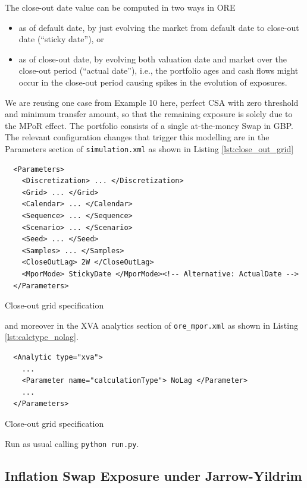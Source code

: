 \documentclass[12pt, a4paper]{article}
\begin{document}
{The close-out date value can be computed in two ways in ORE
\begin{itemize}
\item as of default date, by just evolving the market from default date to close-out date
   (``sticky date''), or 
\item  as of close-out date, by evolving both valuation date and market over the 
   close-out period (``actual date''), i.e., the portfolio ages and cash flows might occur
   in the close-out period causing spikes in the evolution of exposures. 
\end{itemize}

We are reusing one case from Example 10 here, perfect CSA with zero threshold and
minimum transfer amount, so that the remaining exposure is solely due to the MPoR
effect. The portfolio consists of a single at-the-money Swap in GBP. 
The relevant configuration changes that trigger this modelling are in the Parameters section of {\tt simulation.xml} as shown in Listing \ref{lst:close_out_grid}

\begin{listing}[H]
\begin{verbatim}
  <Parameters>
    <Discretization> ... </Discretization>
    <Grid> ... </Grid>
    <Calendar> ... </Calendar>
    <Sequence> ... </Sequence>
    <Scenario> ... </Scenario>
    <Seed> ... </Seed>
    <Samples> ... </Samples>
    <CloseOutLag> 2W </CloseOutLag>
    <MporMode> StickyDate </MporMode><!-- Alternative: ActualDate -->
  </Parameters>
\end{verbatim}
\caption{Close-out grid specification}
\label{lst:close_out_grid}
\end{listing}

and moreover in the XVA analytics section of {\tt ore\_mpor.xml} as shown in Listing \ref{lst:calctype_nolag}.

\begin{listing}[H]
\begin{verbatim}
  <Analytic type="xva">
    ...
    <Parameter name="calculationType"> NoLag </Parameter>
    ...
  </Parameters>
\end{verbatim}
\caption{Close-out grid specification}
\label{lst:calctype_nolag}
\end{listing}

Run as usual calling {\tt python run.py}.

\subsection{Inflation Swap Exposure under Jarrow-Yildrim}%
\label{example:32}

}
\end{document}
